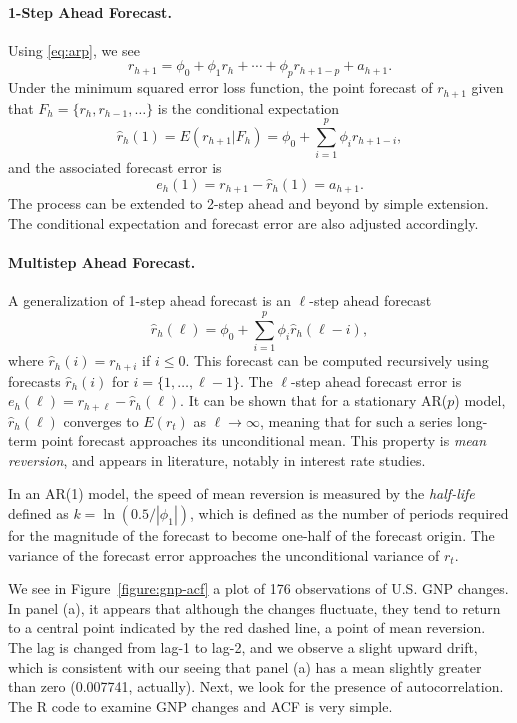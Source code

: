 \paragraph{1-Step Ahead Forecast.} Using \eqref{eq:arp}, we see
\[
r_{h+1} = \phi_0 + \phi_1 r_h + \cdots + \phi_p r_{h+1-p} + a_{h+1}.
\]
Under the minimum squared error loss function, the point forecast of $r_{h+1}$ given that $F_h=\{r_h, r_{h-1}, \ldots \}$ is the conditional expectation
\[
\hat{r}_h(1)=E(r_{h+1} | F_h) = \phi_0 + \sum^{p}_{i=1} \phi_i r_{h+1-i},
\]
and the associated forecast error is
\[
e_h(1)=r_{h+1} - \hat{r}_h(1) = a_{h+1}.
\]
The process can be extended to 2-step ahead and beyond by simple extension. The conditional expectation and forecast error are also adjusted accordingly.

\paragraph{Multistep Ahead Forecast.} A generalization of 1-step ahead forecast is an $\ell$-step ahead forecast
\begin{equation}
\hat{r}_h(\ell) = \phi_0 + \sum^{p}_{i=1} \phi_i \hat{r}_h(\ell-i),
\label{eq:multistep-forecast}
\end{equation}
where $\hat{r}_h(i)=r_{h+i}$ if $i \le 0$. This forecast can be computed recursively using forecasts $\hat{r}_h(i)$ for $i= \{1, \ldots, \ell-1 \}$. The $\ell$-step ahead forecast error is $e_h(\ell)=r_{h+\ell}-\hat{r}_h(\ell)$. It can be shown that for a stationary AR($p$) model, $\hat{r}_h(\ell)$ converges to $E(r_t)$ as $\ell \rightarrow \infty$, meaning that for such a series long-term point forecast approaches its unconditional mean. This property is \emph{mean reversion}, and appears in literature, notably in interest rate studies.

In an AR(1) model, the speed of mean reversion is measured by the \emph{half-life} defined as $k=\ln(0.5 / \left| \phi_1 \right| )$, which is defined as the number of periods required for the magnitude of the forecast to become one-half of the forecast origin. The variance of the forecast error approaches the unconditional variance of $r_t$.

We see in Figure~\ref{figure:gnp-acf} a plot of 176 observations of U.S. GNP changes. In panel (a), it appears that although the changes fluctuate, they tend to return to a central point indicated by the red dashed line, a point of mean reversion. The lag is changed from lag-1 to lag-2, and we observe a slight upward drift, which is consistent with our seeing that panel (a) has a mean slightly greater than zero (0.007741, actually). Next, we look for the presence of autocorrelation. The R code to examine GNP changes and ACF is very simple.

